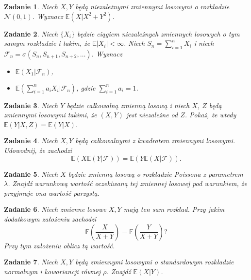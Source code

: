 \documentclass{mwart}
\newtheorem{zd}{Zadanie}
\begin{document}
\begin{zd}
Niech $X, Y$ będą niezależnymi zmiennymi losowymi o rozkładzie $\mathcal{N}(0, 1)$. Wyznacz $\mathbb{E}(X|X^2+Y^2)$.
\end{zd}

\begin{zd}
Niech $\{X_i\}$ będzie ciągiem niezależnych zmiennych losowych o tym samym rozkładzie i takim, że $\mathbb{E}|X_i|<\infty$. Niech $S_n = \sum_{i=1}^nX_i$ i niech $\mathcal{F}_n = \sigma\left(S_n, S_{n+1}, S_{n+2}, \dots\right)$. Wyznacz
\begin{itemize}
\item $\mathbb{E}(X_1|\mathcal{F}_n)$,
\item $\mathbb{E}\left(\sum_{i=1}^na_iX_i|\mathcal{F}_n\right)$, gdzie $\sum_{i=1}^na_i = 1$.
\end{itemize}
\end{zd}

\begin{zd}
Niech $Y$ będzie całkowalną zmienną losową i niech $X$, $Z$ będą zmiennymi losowymi takimi, że $(X, Y)$ jest niezależne od $Z$. Pokaż, że wtedy $\mathbb{E}(Y|X, Z) = \mathbb{E}(Y|X)$.
\end{zd}

\begin{zd}
Niech $X,Y$ będą całkowalnymi z kwadratem zmiennymi losowymi. Udowodnij, że zachodzi
\begin{displaymath}
\mathbb{E}\left(X\mathbb{E}(Y|\mathcal{F})\right) = \mathbb{E}\left(Y\mathbb{E}(X|\mathcal{F})\right).
\end{displaymath}
\end{zd}

\begin{zd}
	Niech $X$ będzie zmienną losową o rozkładzie Poissona z parametrem $\lambda$. Znajdź warunkową wartość oczekiwaną tej zmiennej losowej pod warunkiem, że przyjmuje ona wartość parzystą.
\end{zd}

\begin{zd}
	Niech zmienne losowe $X,Y$ mają ten sam rozkład. Przy jakim dodatkowym założeniu zachodzi
	\begin{displaymath}
		\mathbb{E}\left(\frac{X}{X+Y}\right) = \mathbb{E}\left(\frac{Y}{X+Y}\right)?
	\end{displaymath}
	Przy tym założeniu oblicz tą wartość.
\end{zd}
\begin{zd}
	Niech $X,Y$ będą zmiennymi losowymi o standardowym rozkładzie normalnym i kowariancji równej $\rho$. Znajdź $\mathbb{E}(X|Y)$.
\end{zd}
\end{document}
